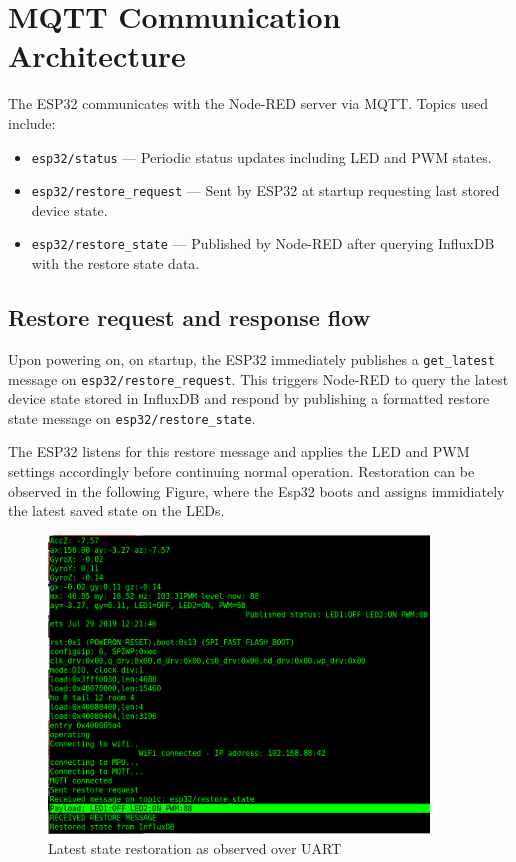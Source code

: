 \documentclass[a4paper,12pt]{article}
\begin{document}
\section{MQTT Communication Architecture}

The ESP32 communicates with the Node-RED 
server via MQTT. Topics used include:

\begin{itemize}
    \item \texttt{esp32/status} — Periodic status updates including LED and PWM states.
    \item \texttt{esp32/restore\_request} — Sent by ESP32 at startup requesting last stored device state.
    \item \texttt{esp32/restore\_state} — Published by Node-RED after querying InfluxDB with the restore state data.
\end{itemize}

\subsection{Restore request and response flow}

Upon powering on, on startup, 
the ESP32 immediately publishes a \texttt{get\_latest} message 
on \texttt{esp32/restore\_request}. 
This triggers Node-RED to query the latest device state 
stored in InfluxDB and respond by publishing a 
formatted restore state message on \texttt{esp32/restore\_state}.

The ESP32 listens for this restore message and 
applies the LED and PWM settings accordingly before 
continuing normal operation.
Restoration can be observed in the following Figure, where the Esp32 
boots and assigns immidiately the latest saved state on the LEDs.

		\begin{figure}[H]
			\centering
			\includegraphics[width=0.9\textwidth]{restore.png}
			\caption{Latest state restoration as observed over UART}
			\label{fig1:}
		\end{figure}		
\end{document}
